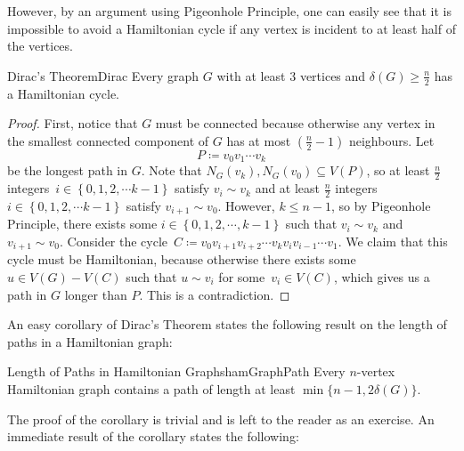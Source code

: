 \documentclass[math]{amznotes}
\theoremstyle{remark}
\begin{document}
However, by an argument using Pigeonhole Principle, one can easily see that it is impossible to avoid a Hamiltonian cycle if any vertex is incident to at least half of the vertices.
\begin{thmbox}{Dirac's Theorem}{Dirac}
    Every graph $G$ with at least $3$ vertices and $\delta(G) \geq \frac{n}{2}$ has a Hamiltonian cycle.
    \tcblower
    \begin{proof}
        First, notice that $G$ must be connected because otherwise any vertex in the smallest connected component of $G$ has at most $\left(\frac{n}{2} - 1\right)$ neighbours. Let 
        \begin{equation*}
            P \coloneqq v_0v_1\cdots v_k
        \end{equation*}
        be the longest path in $G$. Note that $N_G(v_k), N_G(v_0) \subseteq V(P)$, so at least $\frac{n}{2}$ integers~$i \in \left\{0, 1, 2, \cdots k - 1\right\}$ satisfy $v_i \sim v_k$ and at least $\frac{n}{2}$ integers $i \in \left\{0, 1, 2, \cdots k - 1\right\}$ satisfy $v_{i + 1} \sim v_0$. However, $k \leq n - 1$, so by Pigeonhole Principle, there exists some $i \in \left\{0, 1, 2, \cdots, k - 1\right\}$ such that $v_i \sim v_k$ and $v_{i + 1} \sim v_0$. Consider the cycle~$C \coloneqq v_0v_{i + 1}v_{i + 2}\cdots v_kv_iv_{i - 1}\cdots v_1$. We claim that this cycle must be Hamiltonian, because otherwise there exists some $u \in V(G) - V(C)$ such that $u \sim v_i$ for some~$v_i \in V(C)$, which gives us a path in $G$ longer than $P$. This is a contradiction.
    \end{proof}
\end{thmbox}
An easy corollary of Dirac's Theorem states the following result on the length of paths in a Hamiltonian graph:
\begin{corbox}{Length of Paths in Hamiltonian Graphs}{hamGraphPath}
    Every $n$-vertex Hamiltonian graph contains a path of length at least $\min\{n - 1, 2\delta(G)\}$.
\end{corbox}
The proof of the corollary is trivial and is left to the reader as an exercise. An immediate result of the corollary states the following:
\end{document}
